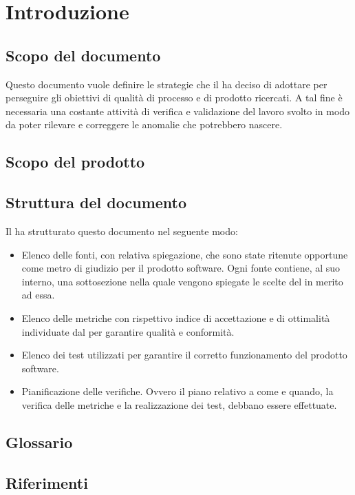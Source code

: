 \section{Introduzione}
\subsection{Scopo del documento}
Questo documento vuole definire le strategie che il  ha deciso di adottare per perseguire gli obiettivi di qualità di processo e di prodotto ricercati. A tal fine è necessaria una costante attività di verifica e validazione del lavoro svolto in modo da poter rilevare e correggere le anomalie che potrebbero nascere.

\subsection{Scopo del prodotto}
\scopoProdotto

\subsection{Struttura del documento}
Il  ha strutturato questo documento nel seguente modo:
\begin{itemize}
\item Elenco delle fonti, con relativa spiegazione, che sono state ritenute opportune come metro di giudizio per il prodotto software. Ogni fonte contiene, al suo interno, una sottosezione nella quale vengono spiegate le scelte del  in merito ad essa.
\item Elenco delle metriche con rispettivo indice di accettazione e di ottimalità individuate dal  per garantire qualità e conformità.
\item Elenco dei test utilizzati per garantire il corretto funzionamento del prodotto software.
\item Pianificazione delle verifiche. Ovvero il piano relativo a come e quando, la verifica delle metriche e la realizzazione dei test, debbano essere effettuate.
\end{itemize}

\subsection{Glossario}
\descrizioneGlossario

\subsection{Riferimenti}
